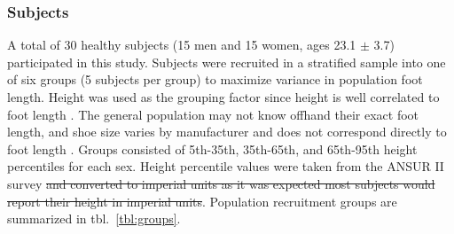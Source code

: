 \documentclass[defaultstyle,11pt]{comps}
\providecommand{\DIFdeltex}[1]{{\protect\color{red}\sout{#1}}}                      %
\providecommand{\DIFdelbegin}{} %
\providecommand{\DIFdelend}{} %
\providecommand{\DIFdel}[1]{\texorpdfstring{\DIFdeltex{#1}}{}} %
\newcommand{\DIFscaledelfig}{0.5}
\newlength{\DIFdelgraphicswidth} %
\newlength{\DIFdelgraphicsheight} %
\newcommand{\DIFdelincludegraphics}[2][]{%
\sbox{\DIFdelgraphicsbox}{\DIFOincludegraphics[#1]{#2}}%
\settoboxwidth{\DIFdelgraphicswidth}{\DIFdelgraphicsbox} %
\settoboxtotalheight{\DIFdelgraphicsheight}{\DIFdelgraphicsbox} %
\scalebox{\DIFscaledelfig}{%
\parbox[b]{\DIFdelgraphicswidth}{\usebox{\DIFdelgraphicsbox}\\[-\baselineskip] \rule{\DIFdelgraphicswidth}{0em}}\llap{\resizebox{\DIFdelgraphicswidth}{\DIFdelgraphicsheight}{%
\setlength{\unitlength}{\DIFdelgraphicswidth}%
\begin{picture}(1,1)%
\thicklines\linethickness{2pt} %
{\color[rgb]{1,0,0}\put(0,0){\framebox(1,1){}}}%
{\color[rgb]{1,0,0}\put(0,0){\line( 1,1){1}}}%
{\color[rgb]{1,0,0}\put(0,1){\line(1,-1){1}}}%
\end{picture}%
}\hspace*{3pt}}} %
} %
\DeclareRobustCommand{\DIFdelbegin}{\DIFOdelbegin \let\includegraphics\DIFdelincludegraphics} %
\DeclareRobustCommand{\DIFdelend}{\DIFOaddend \let\includegraphics\DIFOincludegraphics} %
\begin{document}
\hypertarget{subjects}{%
\subsubsection{Subjects}\label{subjects}}

A total of 30 healthy subjects (15 men and 15 women, ages 23.1 \(\pm\) 3.7) participated in this study.
Subjects were recruited in a stratified sample into one of six groups (5 subjects per group) to maximize variance in population foot length.
Height was used as the grouping factor since height is well correlated to foot length \citep{Giles1991}. The general population may not know offhand their exact foot length, and shoe size varies by manufacturer and does not correspond directly to foot length \citep{Jurca2013, Wannop2019}. Groups consisted of 5th-35th, 35th-65th, and 65th-95th height percentiles for each sex.
Height percentile values were taken from the ANSUR II survey \citep{Gordon2014}\DIFdelbegin \DIFdel{and converted to imperial units as it was expected most subjects would report their height in imperial units}\DIFdelend .
Population recruitment groups are summarized in tbl.~\ref{tbl:groups}.
\end{document}
